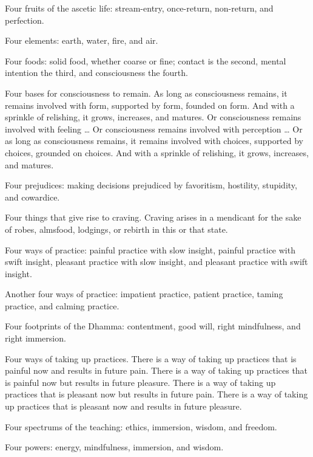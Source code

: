 \documentclass[12pt,openany]{book}%
\begin{document}
Four fruits of the ascetic life: stream-entry, once-return, non-return, and perfection. 

Four elements: earth, water, fire, and air. 

Four foods: solid food, whether coarse or fine; contact is the second, mental intention the third, and consciousness the fourth. 

Four bases for consciousness to remain. As long as consciousness remains, it remains involved with form, supported by form, founded on form. And with a sprinkle of relishing, it grows, increases, and matures. Or consciousness remains involved with feeling … Or consciousness remains involved with perception … Or as long as consciousness remains, it remains involved with choices, supported by choices, grounded on choices. And with a sprinkle of relishing, it grows, increases, and matures. 

Four prejudices: making decisions prejudiced by favoritism, hostility, stupidity, and cowardice. 

Four things that give rise to craving. Craving arises in a mendicant for the sake of robes, almsfood, lodgings, or rebirth in this or that state. 

Four ways of practice: painful practice with slow insight, painful practice with swift insight, pleasant practice with slow insight, and pleasant practice with swift insight. 

Another four ways of practice: impatient practice, patient practice, taming practice, and calming practice. 

Four footprints of the Dhamma: contentment, good will, right mindfulness, and right immersion. 

Four ways of taking up practices. There is a way of taking up practices that is painful now and results in future pain. There is a way of taking up practices that is painful now but results in future pleasure. There is a way of taking up practices that is pleasant now but results in future pain. There is a way of taking up practices that is pleasant now and results in future pleasure. 

Four spectrums of the teaching: ethics, immersion, wisdom, and freedom. 

Four powers: energy, mindfulness, immersion, and wisdom. 
\end{document}
